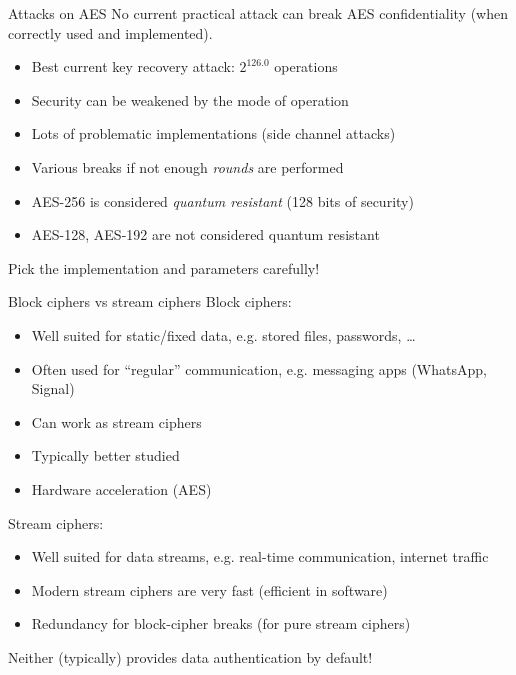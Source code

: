 \begin{frame}{Attacks on AES}
  No current practical attack can break AES confidentiality (when correctly used and implemented).

  \begin{itemize}[<+(1)->]
    \item Best current key recovery attack: $2^{126.0}$ operations
    \item Security can be weakened by the mode of operation
    \item Lots of problematic implementations (side channel attacks)
    \item Various breaks if not enough \emph{rounds} are performed
    \item AES-256 is considered \emph{quantum resistant} (128 bits of security)
    \item AES-128, AES-192 are not considered quantum resistant
  \end{itemize}

  \pause
  Pick the implementation and parameters carefully!
\end{frame}

\begin{frame}{Block ciphers vs stream ciphers}
  Block ciphers:
  \begin{itemize}[<+(1)->]
    \item Well suited for static/fixed data, e.g. stored files, passwords, \dots
    \item Often used for \enquote{regular} communication, e.g. messaging apps (WhatsApp, Signal)
    \item Can work as stream ciphers
    \item Typically better studied
    \item Hardware acceleration (AES)
  \end{itemize}

  \pause
  Stream ciphers:
  \begin{itemize}[<+(1)->]
    \item Well suited for data streams, e.g. real-time communication, internet traffic
    \item Modern stream ciphers are very fast (efficient in software)
    \item Redundancy for block-cipher breaks (for pure stream ciphers)
  \end{itemize}

  \pause
  Neither (typically) provides data authentication by default!
\end{frame}

